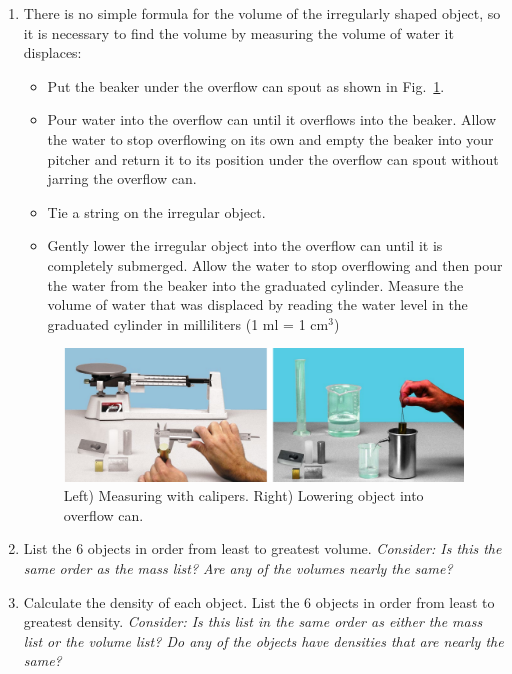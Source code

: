 \begin{enumerate}
\item There is no simple formula for the volume of the irregularly shaped object, so it is necessary to find the volume by measuring the volume of water it displaces:
\begin{itemize}
    \item Put the beaker under the overflow can spout as shown in Fig.~\ref{M08_fluids_Fig03}.
    \item Pour water into the overflow can until it overflows into the beaker. Allow the water to stop overflowing on its own and empty the beaker into your pitcher and return it to its position under the overflow can spout without jarring the overflow can.
    \item Tie a string on the irregular object.
    \item Gently lower the irregular object into the overflow can until it is completely submerged. Allow the water to stop overflowing and then pour the water from the beaker into the graduated cylinder. Measure the volume of water that was displaced by reading the water level in the graduated cylinder in milliliters (1 ml = 1 cm$^3$)
\end{itemize}

\begin{figure}[ht]
  \begin{center}
    \includegraphics[width=4.9in]{Fall/Experiment08Figures_Fluids/M08_fig03.png}
  \end{center}
  \caption{Left) Measuring with calipers. Right) Lowering object into overflow can.}
  \label{M08_fluids_Fig03}
\end{figure}

\item List the 6 objects in order from least to greatest volume. \textit{Consider: Is this the same order as the mass list? Are any of the volumes nearly the same?}

\item Calculate the density of each object. List the 6 objects in order from least to greatest density. \textit{Consider: Is this list in the same order as either the mass list or the volume list? Do any of the objects have densities that are nearly the same?}


\end{enumerate}
